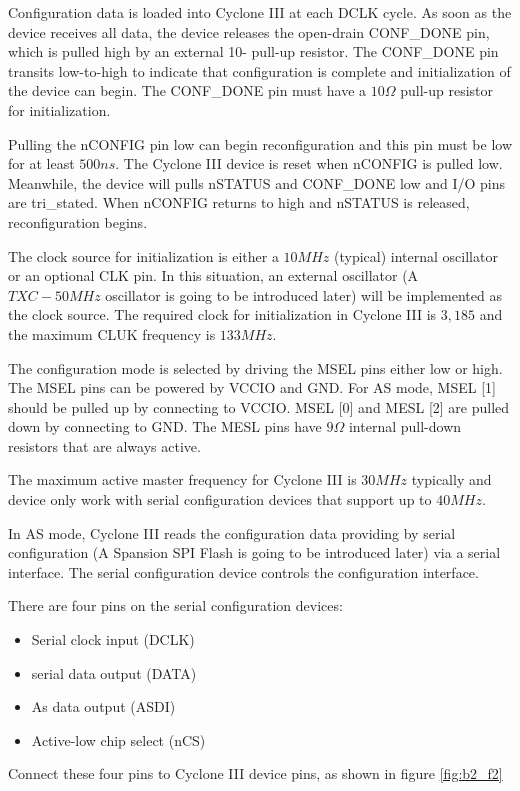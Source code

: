 Configuration data is loaded into Cyclone III at each DCLK cycle. As soon as the device receives all data, the device releases the open-drain CONF\_DONE pin, which is pulled high by an external 10- pull-up resistor. The CONF\_DONE pin transits low-to-high to indicate that configuration is complete and initialization of the device can begin. The CONF\_DONE pin must have a $10\Omega$ pull-up resistor for initialization.

Pulling the nCONFIG pin low can begin reconfiguration and this pin must be low for at least $500ns$. The Cyclone III device is reset when nCONFIG is pulled low. Meanwhile, the device will pulls nSTATUS and CONF\_DONE low and I/O pins are tri\_stated. When nCONFIG returns to high and nSTATUS is released, reconfiguration begins.

The clock source for initialization is either a $10MHz$ (typical) internal oscillator or an optional CLK pin. In this situation, an external oscillator (A $TXC-50MHz$ oscillator is going to be introduced later) will be implemented as the clock source. The required clock for initialization in Cyclone III is $3,185$ and the maximum CLUK frequency is $133MHz$.

The configuration mode is selected by driving the MSEL pins either low or high. The MSEL pins can be powered by VCCIO and GND. For AS mode, MSEL [1] should be pulled up by connecting to VCCIO. MSEL [0] and MESL [2] are pulled down by connecting to GND. The MESL pins have $9\Omega$ internal pull-down resistors that are always active.

The maximum active master frequency for Cyclone III is $30MHz$ typically and device only work with serial configuration devices that support up to $40MHz$.

In AS mode, Cyclone III reads the configuration data providing by serial configuration (A Spansion SPI Flash is going to be introduced later) via a serial interface. The serial configuration device controls the configuration interface.

There are four pins on the serial configuration devices:
\begin{itemize}
 \item Serial clock input (DCLK)
 \item serial data output (DATA)
 \item As data output (ASDI)
 \item Active-low chip select (nCS)
\end{itemize}

Connect these four pins to Cyclone III device pins, as shown in figure \ref{fig:b2_f2}

